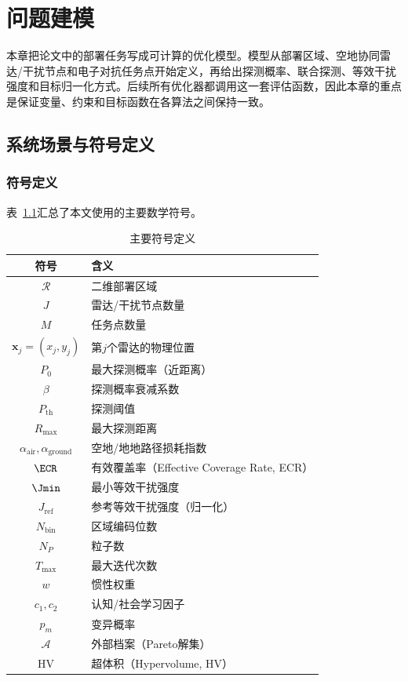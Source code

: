 \chapter{问题建模}\label{chap:model}

本章把论文中的部署任务写成可计算的优化模型。模型从部署区域、空地协同雷达/干扰节点和电子对抗任务点开始定义，再给出探测概率、联合探测、等效干扰强度和目标归一化方式。后续所有优化器都调用这一套评估函数，因此本章的重点是保证变量、约束和目标函数在各算法之间保持一致。

\section{系统场景与符号定义}

\subsection{符号定义}

表~\ref{tab:notation}汇总了本文使用的主要数学符号。

\begin{table}[!htbp]
\centering
\caption{主要符号定义}
\label{tab:notation}
\begin{tabular*}{\textwidth}{@{\extracolsep{\fill}}cl@{}}
\toprule
符号 & 含义 \\
\midrule
$\mathcal{R}$ & 二维部署区域 \\
$J$ & 雷达/干扰节点数量 \\
$M$ & 任务点数量 \\
$\mathbf{x}_j = (x_j, y_j)$ & 第$j$个雷达的物理位置 \\
$P_0$ & 最大探测概率（近距离） \\
$\beta$ & 探测概率衰减系数 \\
$P_{\text{th}}$ & 探测阈值 \\
$R_{\max}$ & 最大探测距离 \\
$\alpha_{\text{air}}, \alpha_{\text{ground}}$ & 空地/地地路径损耗指数 \\
$\ECR$ & 有效覆盖率（Effective Coverage Rate, ECR） \\
$\Jmin$ & 最小等效干扰强度 \\
$J_{\text{ref}}$ & 参考等效干扰强度（归一化） \\
$N_{\text{bin}}$ & 区域编码位数 \\
$N_P$ & 粒子数 \\
$T_{\max}$ & 最大迭代次数 \\
$w$ & 惯性权重 \\
$c_1, c_2$ & 认知/社会学习因子 \\
$p_m$ & 变异概率 \\
$\mathcal{A}$ & 外部档案（Pareto解集） \\
HV & 超体积（Hypervolume, HV） \\
\bottomrule
\end{tabular*}
\end{table}


